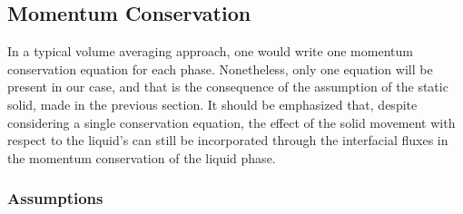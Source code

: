 \subsection{Momentum Conservation}
In a typical volume averaging approach, one would write one momentum conservation 
equation for each phase. Nonetheless, only one equation will be present in our case, 
and that is the consequence of the assumption of the static solid, made in the previous 
section. It should be emphasized that, despite considering a single conservation equation, 
the effect of the solid movement with respect to the liquid's can still be incorporated 
through the interfacial fluxes in the momentum conservation of the liquid phase. 
\subsubsection{Assumptions}
